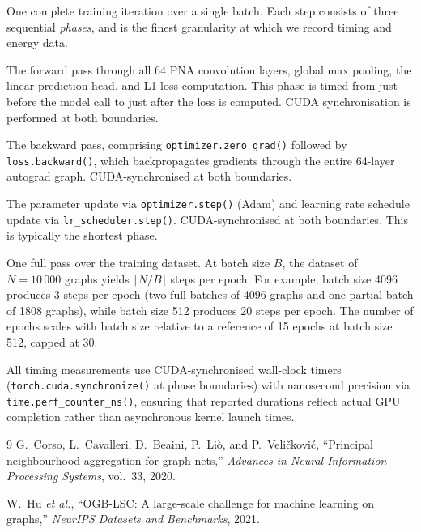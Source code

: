 \documentclass[10pt,twocolumn]{article}
\begin{document}
\begin{description}[nosep, leftmargin=1em, style=nextline]
    \item[Step] One complete training iteration over a single batch. Each step consists of three sequential \emph{phases}, and is the finest granularity at which we record timing and energy data.
    \item[Forward phase] The forward pass through all 64 PNA convolution layers, global max pooling, the linear prediction head, and L1 loss computation. This phase is timed from just before the model call to just after the loss is computed. CUDA synchronisation is performed at both boundaries.
    \item[Backward phase] The backward pass, comprising \texttt{optimizer.zero\_grad()} followed by \texttt{loss.backward()}, which backpropagates gradients through the entire 64-layer autograd graph. CUDA-synchronised at both boundaries.
    \item[Optimizer phase] The parameter update via \texttt{optimizer.step()} (Adam) and learning rate schedule update via \texttt{lr\_scheduler.step()}. CUDA-synchronised at both boundaries. This is typically the shortest phase.
    \item[Epoch] One full pass over the training dataset. At batch size $B$, the dataset of $N = 10\,000$ graphs yields $\lceil N/B \rceil$ steps per epoch. For example, batch size 4096 produces 3 steps per epoch (two full batches of 4096 graphs and one partial batch of 1808 graphs), while batch size 512 produces 20 steps per epoch. The number of epochs scales with batch size relative to a reference of 15 epochs at batch size 512, capped at 30.
\end{description}

All timing measurements use CUDA-synchronised wall-clock timers (\texttt{torch.cuda.synchronize()} at phase boundaries) with nanosecond precision via \texttt{time.perf\_counter\_ns()}, ensuring that reported durations reflect actual GPU completion rather than asynchronous kernel launch times.


\begin{thebibliography}{9}
G.~Corso, L.~Cavalleri, D.~Beaini, P.~Li\`{o}, and P.~Veli\v{c}kovi\'{c},
``Principal neighbourhood aggregation for graph nets,''
\emph{Advances in Neural Information Processing Systems}, vol.~33, 2020.

W.~Hu \emph{et al.},
``OGB-LSC: A large-scale challenge for machine learning on graphs,''
\emph{NeurIPS Datasets and Benchmarks}, 2021.
\end{thebibliography}
\end{document}

